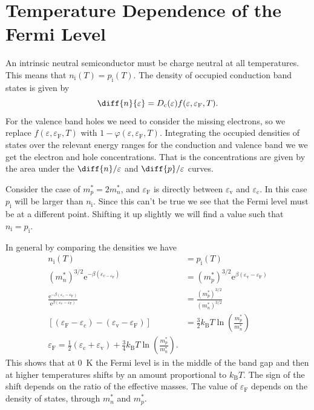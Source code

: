 \documentclass[fleqn]{NotesClass}
\newcommand*{\boltzmann}{k_{\mathrm{B}}}
\newcommand*{\e}{\mathrm{e}}
\newcommand*{\fermi}{\mathrm{F}}
\begin{document}
    \section{Temperature Dependence of the Fermi Level}
    An intrinsic neutral semiconductor must be charge neutral at all temperatures.
    This means that \(n_{\mathrm{i}}(T) = p_{\mathrm{i}}(T)\).
    The density of occupied conduction band states is given by
    \begin{equation}
        \diff{n}{\varepsilon} = D_{\mathrm{c}}(\varepsilon) f(\varepsilon, \varepsilon_{\fermi}, T).
    \end{equation}
    For the valence band holes we need to consider the missing electrons, so we replace \(f(\varepsilon, \varepsilon_{\fermi}, T)\) with \(1 - \varphi(\varepsilon, \varepsilon_{\fermi}, T)\).
    Integrating the occupied densities of states over the relevant energy ranges for the conduction and valence band we we get the electron and hole concentrations.
    That is the concentrations are given by the area under the \(\diff{n}/{\varepsilon}\) and \(\diff{p}/{\varepsilon}\) curves.
    
    Consider the case of \(m_p^* = 2m_n^*\), and \(\varepsilon_{\fermi}\) is directly between \(\varepsilon_{\mathrm{v}}\) and \(\varepsilon_{\mathrm{c}}\).
    In this case \(p_{\mathrm{i}}\) will be larger than \(n_{\mathrm{i}}\).
    Since this can't be true we see that the Fermi level must be at a different point.
    Shifting it up slightly we will find a value such that \(n_{\mathrm{i}} = p_{\mathrm{i}}\).
    
    In general by comparing the densities we have
    \begin{align}
        n_{\mathrm{i}}(T) &= p_{\mathrm{i}}(T)\\
        (m_n^*)^{3/2}\e^{-\beta(\varepsilon_{\mathrm{c} - \varepsilon_{\fermi}})} &= (m_p^*)^{3/2}\e^{\beta(\varepsilon_{\mathrm{v}} - \varepsilon_{\fermi})}\\
        \frac{\e^{-\beta(\varepsilon_{\mathrm{c}} - \varepsilon_{\fermi})}}{\e^{\beta(\varepsilon_{\mathrm{v}} - \varepsilon_{\fermi})}} &= \frac{(m_p^*)^{3/2}}{(m_n^*)^{3/2}}\\
        [(\varepsilon_{\fermi} - \varepsilon_{\mathrm{c}}) - (\varepsilon_{\mathrm{v}} - \varepsilon_{\fermi})] &= \frac{3}{2}\boltzmann T\ln\left( \frac{m_p^*}{m_n^*} \right)\\
        \varepsilon_{\fermi} = \frac{1}{2}(\varepsilon_{\mathrm{c}} + \varepsilon_{\mathrm{v}}) + \frac{3}{4}\boltzmann T\ln\left( \frac{m_p^*}{m_n^*} \right).
    \end{align}
    This shows that at \qty{0}{\kelvin} the Fermi level is in the middle of the band gap and then at higher temperatures shifts by an amount proportional to \(\boltzmann T\).
    The sign of the shift depends on the ratio of the effective masses.
    The value of \(\varepsilon_{\fermi}\) depends on the density of states, through \(m_n^*\) and \(m_p^*\).
    
\end{document}
